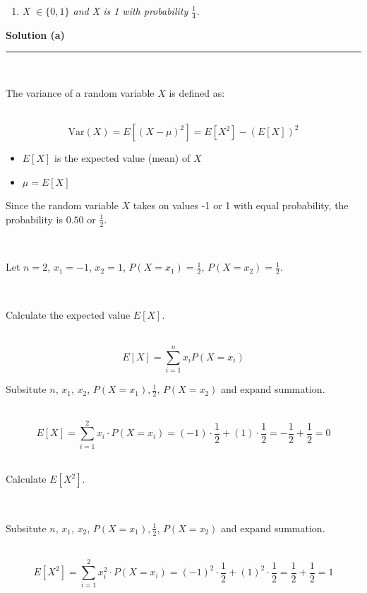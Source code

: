 \documentclass{article}
\begin{document}
\begin{enumerate}[label=(c)]
  \item \textit{X $\in \{0,1\}$ and X is 1 with probability $\frac{1}{4}$.}
\end{enumerate}

\textbf{Solution (a)}

\noindent\rule{\textwidth}{0.4pt}\\

\parbox{\textwidth}{The variance of a random variable $X$ is defined as:}\\

$$\text{Var}(X) = E[(X - \mu)^2] = E[X^2] - (E[X])^2$$

\begin{itemize}
    \item $E[X]$ is the expected value (mean) of $X$
    \item $\mu = E[X]$
\end{itemize}

\parbox{\textwidth}{Since the random variable $X$ takes on values -1 or 1 with equal probability, the probability is $0.50$ or $\frac{1}{2}$.}\\

\parbox{\textwidth}{Let $n = 2$, $x_1 = -1$, $x_2 = 1$, $P(X = x_1) = \frac{1}{2}$, $P(X = x_2) = \frac{1}{2}$.}\\

\parbox{\textwidth}{Calculate the expected value $E[X]$.}\\

$$E[X] = \sum^{n}_{i=1} x_i P(X = x_i)$$

\parbox{\textwidth}{Subsitute $n$, $x_1$, $x_2$, $P(X = x_1), \frac{1}{2}$, $P(X = x_2)$ and expand summation.}\\

$$E[X] = \sum^2_{i=1} x_i \cdot P(X = x_i) = (-1) \cdot \frac{1}{2} + (1) \cdot \frac{1}{2} = -\frac{1}{2} + \frac{1}{2} = 0$$\\

\parbox{\textwidth}{Calculate $E[X^2]$.}\\

\parbox{\textwidth}{Subsitute $n$, $x_1$, $x_2$, $P(X = x_1), \frac{1}{2}$, $P(X = x_2)$ and expand summation.}\\

$$E[X^2] = \sum^2_{i=1} x_i^2 \cdot P(X = x_i) = (-1)^2 \cdot \frac{1}{2} + (1)^2 \cdot \frac{1}{2} = \frac{1}{2} + \frac{1}{2} = 1$$\\
\end{document}
